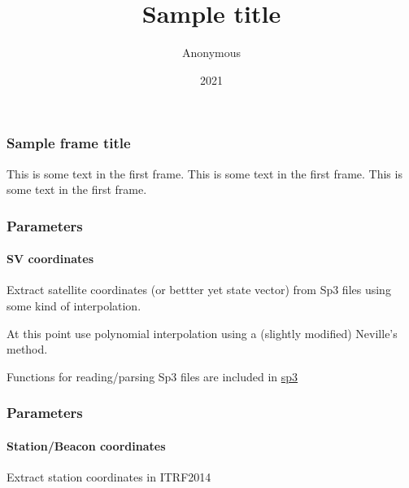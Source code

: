 \documentclass{beamer}
\title{Sample title}
\author{Anonymous}
\institute{Overleaf}
\date{2021}
\begin{document}
\frame{\titlepage}

\begin{frame}
\frametitle{Sample frame title}
This is some text in the first frame. This is some text in the first frame. This is some text in the first frame.
\end{frame}

\begin{frame}\frametitle{Parameters}\framesubtitle{SV coordinates}
    Extract satellite coordinates (or bettter yet state vector) from Sp3 files 
    using some kind of interpolation.\\
    \vspace{.3cm}
    
    At this point use polynomial interpolation using a (slightly modified) Neville's \citet{numrec3}
    method.\\
    \vspace{.3cm}
    
    Functions for reading/parsing Sp3 files are included in \href{https://github.com/xanthospap/sp3}{sp3}
\end{frame}

\begin{frame}\frametitle{Parameters}\framesubtitle{Station/Beacon coordinates}
    Extract station coordinates in ITRF2014
\end{frame}
\end{document}
